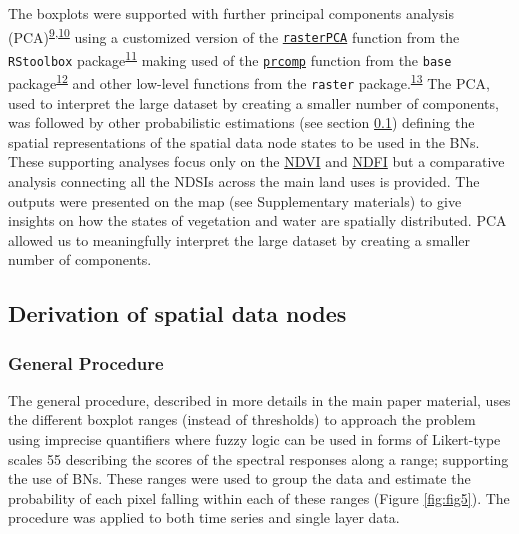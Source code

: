 \documentclass[12pt,oneside]{article}
\begin{document}
The boxplots were supported with further principal components analysis (PCA)\textsuperscript{\protect\hyperlink{ref-Mardia_et_al_1979}{9},\protect\hyperlink{ref-Pearson_1901}{10}} using a customized version of the \href{https://www.rdocumentation.org/packages/RStoolbox/versions/0.2.4/topics/rasterPCA}{\texttt{rasterPCA}} function from the \texttt{RStoolbox} package\textsuperscript{\protect\hyperlink{ref-Leutner_et_al_2019}{11}} making used of the \href{https://www.rdocumentation.org/packages/kazaam/versions/0.1-0/topics/prcomp}{\texttt{prcomp}} function from the \texttt{base} package\textsuperscript{\protect\hyperlink{ref-RCoreTeam_2018}{12}} and other low-level functions from the \texttt{raster} package.\textsuperscript{\protect\hyperlink{ref-Hijmans_2019}{13}} The PCA, used to interpret the large dataset by creating a smaller number of components, was followed by other probabilistic estimations (see section \ref{I5}) defining the spatial representations of the spatial data node states to be used in the BNs. These supporting analyses focus only on the \href{https://www.sciencedirect.com/science/article/pii/0034425779900130?via\%3Dihub}{NDVI} and \href{http://journals.plos.org/plosone/article/file?id=10.1371/journal.pone.0088741\&type=printable}{NDFI} but a comparative analysis connecting all the NDSIs across the main land uses is provided. The outputs were presented on the map (see Supplementary materials) to give insights on how the states of vegetation and water are spatially distributed. PCA allowed us to meaningfully interpret the large dataset by creating a smaller number of components.

\hypertarget{I5}{%
\subsection{Derivation of spatial data nodes}\label{I5}}

\hypertarget{I51}{%
\subsubsection{General Procedure}\label{I51}}

The general procedure, described in more details in the main paper material, uses the different boxplot ranges (instead of thresholds) to approach the problem using imprecise quantifiers where fuzzy logic can be used in forms of Likert-type scales 55 describing the scores of the spectral responses along a range; supporting the use of BNs. These ranges were used to group the data and estimate the probability of each pixel falling within each of these ranges (Figure \ref{fig:fig5}). The procedure was applied to both time series and single layer data.
\end{document}
